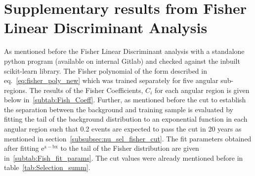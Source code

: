 \chapter{Supplementary results from Fisher Linear Discriminant Analysis}
\label{sec:app_4}

As mentioned before the Fisher Linear Discriminant analysis with a standalone python program (available on internal Gitlab) and checked against the inbuilt scikit-learn library. The Fisher polynomial of the form described in eq.~\ref{eq:fisher_poly_new} which was trained separately for five angular sub-regions. The results of the Fisher Coefficients, $C_i$ for each angular region is given below in~\ref{subtab:Fish_Coeff}. 
Further, as mentioned before the cut to establish the separation between the background and training sample is evaluated by fitting the tail of the background distribution to an exponential function in each angular region such that 0.2 events are expected to pass the cut in 20 years as mentioned in section~\ref{subsubsec:nu_sel_fisher_cut}. The fit parameters obtained after fitting $\mathrm{e^{a-bx}}$ to the tail of the Fisher distribution are given in~\ref{subtab:Fish_fit_params}. The cut values were already mentioned before in table~\ref{tab:Selection_summ}.


